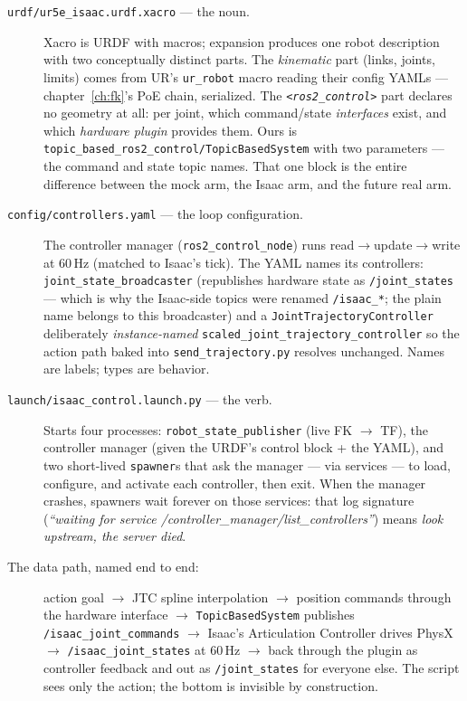 \begin{description}
\item[\texttt{urdf/ur5e\_isaac.urdf.xacro} --- the noun.] Xacro is URDF with macros; expansion
produces one robot description with two conceptually distinct parts. The \emph{kinematic}
part (links, joints, limits) comes from UR's \texttt{ur\_robot} macro reading their config
YAMLs --- chapter~\ref{ch:fk}'s PoE chain, serialized. The \emph{\texttt{<ros2\_control>}}
part declares no geometry at all: per joint, which command/state \emph{interfaces} exist, and
which \emph{hardware plugin} provides them. Ours is
\texttt{topic\_based\_ros2\_control/TopicBasedSystem} with two parameters --- the command and
state topic names. That one block is the entire difference between the mock arm, the Isaac
arm, and the future real arm.

\item[\texttt{config/controllers.yaml} --- the loop configuration.] The controller manager
(\texttt{ros2\_control\_node}) runs read$\to$update$\to$write at 60\,Hz (matched to Isaac's
tick). The YAML names its controllers: \texttt{joint\_state\_broadcaster} (republishes
hardware state as \texttt{/joint\_states} --- which is why the Isaac-side topics were renamed
\texttt{/isaac\_*}; the plain name belongs to this broadcaster) and a
\texttt{JointTrajectoryController} deliberately \emph{instance-named}
\texttt{scaled\_joint\_trajectory\_controller} so the action path baked into
\texttt{send\_trajectory.py} resolves unchanged. Names are labels; types are behavior.

\item[\texttt{launch/isaac\_control.launch.py} --- the verb.] Starts four processes:
\texttt{robot\_state\_publisher} (live FK $\to$ TF), the controller manager (given the URDF's
control block + the YAML), and two short-lived \texttt{spawner}s that ask the manager ---
via services --- to load, configure, and activate each controller, then exit. When the manager
crashes, spawners wait forever on those services: that log signature
(\emph{``waiting for service /controller\_manager/list\_controllers''}) means \emph{look
upstream, the server died}.

\item[The data path, named end to end:] action goal $\to$ JTC spline interpolation $\to$
position commands through the hardware interface $\to$ \texttt{TopicBasedSystem} publishes
\texttt{/isaac\_joint\_commands} $\to$ Isaac's Articulation Controller drives PhysX $\to$
\texttt{/isaac\_joint\_states} at 60\,Hz $\to$ back through the plugin as controller feedback
and out as \texttt{/joint\_states} for everyone else. The script sees only the action; the
bottom is invisible by construction.
\end{description}

